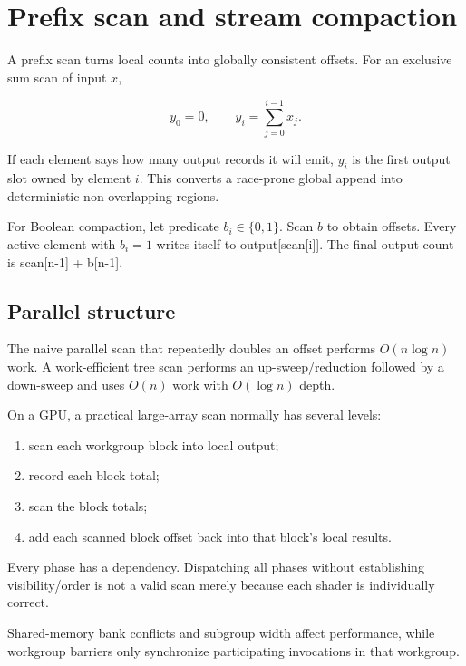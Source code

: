 \hypertarget{appendix-f2ee4d086415}{}\label{referencestart:appendix-f2ee4d086415}
\section{Prefix scan and stream compaction}\label{appendix-f2ee4d086415-prefix-scan-and-stream-compaction}

A prefix scan turns local counts into globally consistent offsets. For an exclusive sum scan of input \(x\),

\[
y_0=0,
\qquad
y_i=\sum_{j=0}^{i-1}x_j.
\]

If each element says how many output records it will emit, \(y_i\) is the first output slot owned by element \(i\). This converts a race-prone global append into deterministic non-overlapping regions.

For Boolean compaction, let predicate \(b_i\in\{0,1\}\). Scan \(b\) to obtain offsets. Every active element with \(b_i=1\) writes itself to output{[}scan{[}i{]}{]}. The final output count is scan{[}n-1{]} + b{[}n-1{]}.

\subsection{Parallel structure}\label{appendix-f2ee4d086415-parallel-structure}

The naive parallel scan that repeatedly doubles an offset performs \(O(n\log n)\) work. A work-efficient tree scan performs an up-sweep/reduction followed by a down-sweep and uses \(O(n)\) work with \(O(\log n)\) depth.

On a GPU, a practical large-array scan normally has several levels:

\begin{enumerate}
\def\labelenumi{\arabic{enumi}.}
\tightlist
\item
  scan each workgroup block into local output;
\item
  record each block total;
\item
  scan the block totals;
\item
  add each scanned block offset back into that block's local results.
\end{enumerate}

Every phase has a dependency. Dispatching all phases without establishing visibility/order is not a valid scan merely because each shader is individually correct.

Shared-memory bank conflicts and subgroup width affect performance, while workgroup barriers only synchronize participating invocations in that workgroup.


